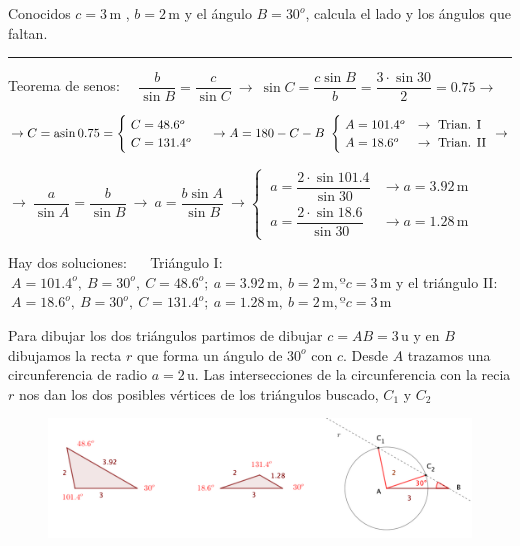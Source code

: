 \begin{miejercicio}

Conocidos $c=3\, \mathrm{m}$ , $b=2\, \mathrm{m}$ y el ángulo $B=30^o$, calcula el lado  y los ángulos que faltan.

\rule{250pt}{0.1pt}

\vspace{2mm} Teorema de senos: $\quad \dfrac{b}{\sin B}=\dfrac{c}{\sin C} \ \to \ \sin C=\dfrac{c\sin B}{b}=\dfrac{3\cdot \sin 30}{2}=0.75 \to $

\vspace{2mm}  $\to C=\asin 0.75 = \begin{cases} \ C= 48.6^o  \\ \ C=131.4^o \end{cases} \ \to  A=180-C-B \ \begin{cases} 
\ A=101.4^o &\to  \text{ Trian. I} \\  
\ A=18.6^o  &\to  \text{ Trian. II} 
\end{cases} \ \to $

\vspace{2mm}  $\to \   \dfrac{a}{\sin A}=\dfrac{b}{\sin B} \ \to \ a=\dfrac{b\sin A}{\sin B} \ \to 
\begin{cases}
\ a=\dfrac{2\cdot \sin 101.4}{\sin 30 } &\to a=3.92 \, \mathrm{m} \\ 	
\ a=\dfrac{2\cdot \sin 18.6}{\sin 30 } &\to a=1.28 \, \mathrm{m} 
\end{cases}$
 
\vspace{4mm}  Hay dos soluciones: $\quad $ Triángulo I: $\ A=101.4^o,\ B=30^o, \ C= 48.6^o ; \ a=3.92 \, \mathrm{m} ,\ b= 2\, \mathrm{m} , º c=3 \, \mathrm{m} $ y el triángulo II:  $\ A=18.6^o,\ B=30^o, \ C= 131.4^o ; \ a=1.28 \, \mathrm{m} ,\ b= 2\, \mathrm{m} , º c=3 \, \mathrm{m} $

\vspace{2mm} \textcolor{gris}{Para dibujar los dos triángulos partimos de dibujar $c=AB=3\, \mathrm{u}$ y en $B$ dibujamos la recta $r$ que forma un ángulo de $30^o$ con $c$. Desde $A$ trazamos una circunferencia de radio $a=2 \, \mathrm{u}$. Las intersecciones de la circunferencia con la recia $r$ nos dan los dos posibles vértices de los triángulos buscado, $C_1$ y $C_2$}
\begin{figure}[H]
	\centering
	\includegraphics[width=1\textwidth]{img-triang/triang10.png}
\end{figure}
	
\end{miejercicio}

